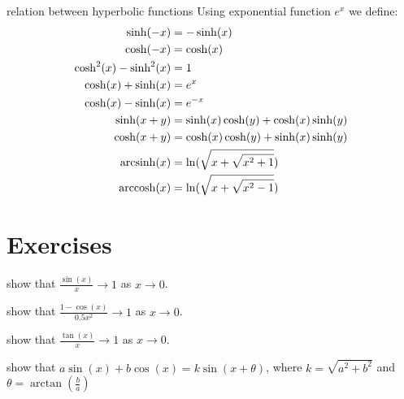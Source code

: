 \documentclass{article}
\begin{document}
\begin{myleftlinebox}
	relation between hyperbolic functions
	\tcblower
	Using exponential function $e^x$ we define:
	\begin{align*}
		\sinh(-x) &= -\sinh(x)\\
		\cosh(-x) &= \cosh(x)\\
		\cosh^2(x) -\sinh^2(x) &= 1\\
		\cosh(x)+\sinh(x)&=e^x\\
		\cosh(x)-\sinh(x)&=e^{-x}\\
		\sinh(x+y) &=\sinh(x)\cosh(y)+\cosh(x)\sinh(y)\\
		\cosh(x+y) &=\cosh(x)\cosh(y)+\sinh(x)\sinh(y)\\
		\operatorname{arcsinh}(x)&=\ln(\sqrt{x+\sqrt{x^2+1}})\\
		\operatorname{arccosh}(x)&=\ln(\sqrt{x+\sqrt{x^2-1}})\\
	\end{align*}
\end{myleftlinebox}

\section{Exercises}

\begin{myleftlinebox}
	show that $\frac{\sin(x)}{x}\to 1$ as $x\to 0$.
	\tcblower
	\vspace{2em}
\end{myleftlinebox}

\begin{myleftlinebox}
	show that $\frac{1-\cos(x)}{0.5x^2}\to 1$ as $x\to 0$.
	\tcblower
	\vspace{2em}
\end{myleftlinebox}

\begin{myleftlinebox}
	show that $\frac{\tan(x)}{x}\to 1$ as $x\to 0$.
	\tcblower
	\vspace{2em}
\end{myleftlinebox}

\begin{myleftlinebox}
	show that $a\sin(x)+b\cos(x)=k\sin(x+\theta)$, where $k=\sqrt{a^2+b^2}$ and $\theta=\arctan(\frac{b}{a})$
	\tcblower
	\vspace{2em}
\end{myleftlinebox}
\end{document}
